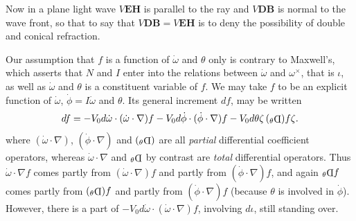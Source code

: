 \documentclass[11pt]{article}
\newcommand{\invd}{\mathord{\vcenter{\hbox{\rotatebox[origin=c]{180}{\(\mathrm{D}\)}}}}}
\newcommand{\thetaPi}{{}_\theta\invd}
\begin{document}

\indent Now in a plane light wave $V\mathbf E\mathbf H$ is parallel to the ray and $V\mathbf D\mathbf B$ is normal to the wave front, so that to say that $V\mathbf D\mathbf B=V\mathbf E\mathbf H$ is to deny the possibility of double and conical refraction.

\indent Our assumption that $f$ is a function of $\dot\omega$ and $\theta$ only is contrary to Maxwell's, which asserts that $N$ and $I$ enter into the relations between $\dot\omega$ and $\omega^\times$, that is $\iota$, as well as $\dot\omega$ and $\theta$ is a constituent variable of $f$. We may take $f$ to be an explicit function of $\dot\omega$, $\dot\phi=I\dot\omega$ and $\theta$. Its general increment $df$, may be written
\[
  df=-V_0d\dot\omega\mathbin{\cdot}(\dot\omega\mathbin{\cdot}\nabla)f
     -V_0d\dot\phi\mathbin{\cdot}(\dot\phi\mathbin{\cdot}\nabla)f
     -V_0d\theta\zeta\,(\thetaPi)f\zeta.
\]
where $(\dot\omega\mathbin{\cdot}\nabla)$, $(\dot\phi\mathbin{\cdot}\nabla)$ and $(\thetaPi)$ are all \emph{partial} differential coefficient operators, whereas $\dot\omega\mathbin{\cdot}\nabla$ and $\thetaPi$ by contrast are \emph{total} differential operators. Thus $\dot\omega\mathbin{\cdot}\nabla f$ comes partly from $(\dot\omega\mathbin{\cdot}\nabla)f$ and partly from $(\dot\phi\mathbin{\cdot}\nabla)f$, and again $\thetaPi f$ comes partly from $(\thetaPi)f$ and partly from $(\dot\phi\mathbin{\cdot}\nabla)f$ (because $\theta$ is involved in $\dot\phi$). However, there is a part of $-V_0d\dot\omega\mathbin{\cdot}(\dot\omega\mathbin{\cdot}\nabla)f$, involving $d\iota$, still standing over.
\end{document}
